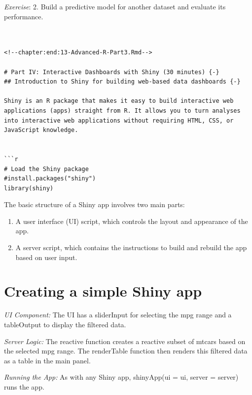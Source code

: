 \documentclass[
]{book}
\providecommand{\tightlist}{%
  \setlength{\itemsep}{0pt}\setlength{\parskip}{0pt}}
\begin{document}
\emph{Exercise}:
2. Build a predictive model for another dataset and evaluate its performance.

\begin{verbatim}


<!--chapter:end:13-Advanced-R-Part3.Rmd-->

# Part IV: Interactive Dashboards with Shiny (30 minutes) {-}
## Introduction to Shiny for building web-based data dashboards {-}

Shiny is an R package that makes it easy to build interactive web applications (apps) straight from R. It allows you to turn analyses into interactive web applications without requiring HTML, CSS, or JavaScript knowledge.


```r
# Load the Shiny package
#install.packages("shiny")
library(shiny)
\end{verbatim}

The basic structure of a Shiny app involves two main parts:

\begin{enumerate}
\def\labelenumi{\arabic{enumi}.}
\tightlist
\item
  A user interface (UI) script, which controls the layout and appearance of the app.
\item
  A server script, which contains the instructions to build and rebuild the app based on user input.
\end{enumerate}

\section*{Creating a simple Shiny app}\label{creating-a-simple-shiny-app}

\emph{UI Component:} The UI has a sliderInput for selecting the mpg range and a tableOutput to display the filtered data.

\emph{Server Logic:} The reactive function creates a reactive subset of mtcars based on the selected mpg range. The renderTable function then renders this filtered data as a table in the main panel.

\emph{Running the App:} As with any Shiny app, shinyApp(ui = ui, server = server) runs the app.
\end{document}
